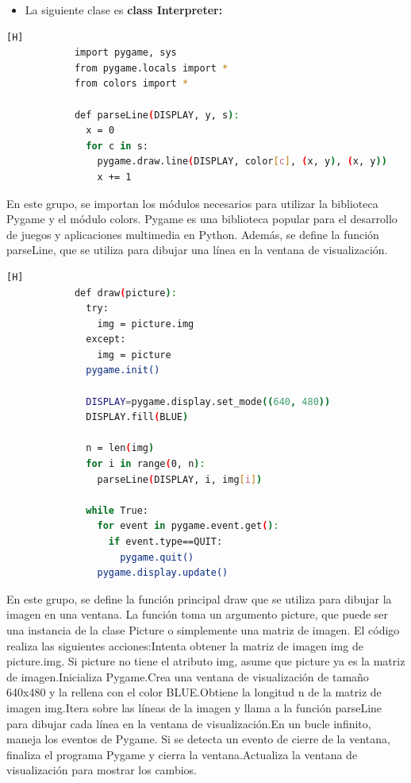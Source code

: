 \documentclass{article}
\begin{document}
	\begin{itemize}	
		\item La siguiente clase es \textbf{class Interpreter:} 
	\end{itemize}
	\begin{lstlisting}[language=bash,caption={Importación de módulos y definición de la función parseLine}][H]
            import pygame, sys
            from pygame.locals import *
            from colors import *
            
            def parseLine(DISPLAY, y, s):
              x = 0
              for c in s:
                pygame.draw.line(DISPLAY, color[c], (x, y), (x, y))
                x += 1
	\end{lstlisting}
En este grupo, se importan los módulos necesarios para utilizar la biblioteca Pygame y el módulo colors. Pygame es una biblioteca popular para el desarrollo de juegos y aplicaciones multimedia en Python. Además, se define la función parseLine, que se utiliza para dibujar una línea en la ventana de visualización.	

	\begin{lstlisting}[language=bash,caption={Definición de la función draw}][H]
            def draw(picture):
              try:
                img = picture.img
              except:
                img = picture
              pygame.init()
            
              DISPLAY=pygame.display.set_mode((640, 480))
              DISPLAY.fill(BLUE)
            
              n = len(img)
              for i in range(0, n):
                parseLine(DISPLAY, i, img[i])
            
              while True:
                for event in pygame.event.get():
                  if event.type==QUIT:
                    pygame.quit()
                pygame.display.update()
	\end{lstlisting}
En este grupo, se define la función principal draw que se utiliza para dibujar la imagen en una ventana. La función toma un argumento picture, que puede ser una instancia de la clase Picture o simplemente una matriz de imagen. El código realiza las siguientes acciones:Intenta obtener la matriz de imagen img de picture.img. Si picture no tiene el atributo img, asume que picture ya es la matriz de imagen.Inicializa Pygame.Crea una ventana de visualización de tamaño 640x480 y la rellena con el color BLUE.Obtiene la longitud n de la matriz de imagen img.Itera sobre las líneas de la imagen y llama a la función parseLine para dibujar cada línea en la ventana de visualización.En un bucle infinito, maneja los eventos de Pygame. Si se detecta un evento de cierre de la ventana, finaliza el programa Pygame y cierra la ventana.Actualiza la ventana de visualización para mostrar los cambios.
\end{document}
